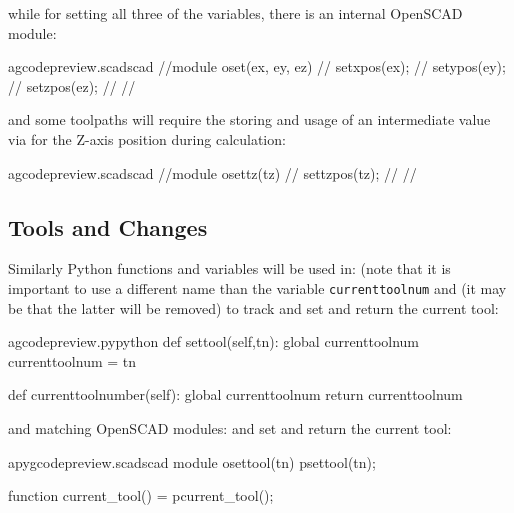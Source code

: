 \documentclass{ltxdoc}
\begin{document}
\noindent{} while for setting all three of the variables, there is an internal OpenSCAD module:

\lstset{firstnumber=\thegcpscad}
\begin{writecode}{a}{gcodepreview.scad}{scad}
//module oset(ex, ey, ez) {
//    setxpos(ex);
//    setypos(ey);
//    setzpos(ez);
//}
//
\end{writecode}
\addtocounter{gcpscad}{6}
 
\noindent and some toolpaths will require the storing and usage of an intermediate value via  for the Z-axis position during calculation:

\lstset{firstnumber=\thegcpscad}
\begin{writecode}{a}{gcodepreview.scad}{scad}
//module osettz(tz) {
//    settzpos(tz);
//}
//
\end{writecode}
\addtocounter{gcpscad}{4}

\subsection{Tools and Changes}
 
Similarly Python functions and variables will be used in:  (note that it is important to use a different name than the variable \verb|currenttoolnum| and  (it may be that the latter will be removed) to track and set and return the current tool:
 
\lstset{firstnumber=\thegcpy}
\begin{writecode}{a}{gcodepreview.py}{python}
    def settool(self,tn):
        global currenttoolnum
        currenttoolnum = tn

    def currenttoolnumber(self):
        global currenttoolnum
        return currenttoolnum

\end{writecode}
\addtocounter{gcpy}{8}
 
\noindent and matching OpenSCAD modules:
 and
set and return the current tool: 
  
\lstset{firstnumber=\thepyscad}
\begin{writecode}{a}{pygcodepreview.scad}{scad}
module osettool(tn){
    psettool(tn);
}

function current_tool() = pcurrent_tool();

\end{writecode}
\addtocounter{pyscad}{6}
\end{document}

